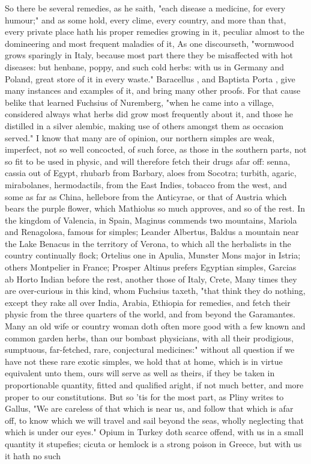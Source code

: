 {So there be several remedies, as he saith, "each disease a medicine, for every humour;" and as some hold, every clime, every country, and more than that, every private place hath his proper remedies growing in it, peculiar almost to the domineering and most frequent maladies of it, As one discourseth, "wormwood grows sparingly in Italy, because most part there they be misaffected with hot diseases: but henbane, poppy, and such cold herbs: with us in Germany and Poland, great store of it in every waste." Baracellus , and Baptista Porta , give many instances and examples of it, and bring many other proofs. For that cause belike that learned Fuchsius of Nuremberg, "when he came into a village, considered always what herbs did grow most frequently about it, and those he distilled in a silver alembic, making use of others amongst them as occasion served." I know that many are of opinion, our northern simples are weak, imperfect, not so well concocted, of such force, as those in the southern parts, not so fit to be used in physic, and will therefore fetch their drugs afar off: senna, cassia out of Egypt, rhubarb from Barbary, aloes from Socotra; turbith, agaric, mirabolanes, hermodactils, from the East Indies, tobacco from the west, and some as far as China, hellebore from the Anticyrae, or that of Austria which bears the purple flower, which Mathiolus so much approves, and so of the rest. In the kingdom of Valencia, in Spain, Maginus commends two mountains, Mariola and Renagolosa, famous for simples; Leander Albertus, Baldus a mountain near the Lake Benacus in the territory of Verona, to which all the herbalists in the country continually flock; Ortelius one in Apulia, Munster Mons major in Istria; others Montpelier in France; Prosper Altinus prefers Egyptian simples, Garcias ab Horto Indian before the rest, another those of Italy, Crete, \etc{} Many times they are over-curious in this kind, whom Fuchsius taxeth,  "that think they do nothing, except they rake all over India, Arabia, Ethiopia for remedies, and fetch their physic from the three quarters of the world, and from beyond the Garamantes. Many an old wife or country woman doth often more good with a few known and common garden herbs, than our bombast physicians, with all their prodigious, sumptuous, far-fetched, rare, conjectural medicines:" without all question if we have not these rare exotic simples, we hold that at home, which is in virtue equivalent unto them, ours will serve as well as theirs, if they be taken in proportionable quantity, fitted and qualified aright, if not much better, and more proper to our constitutions. But so 'tis for the most part, as Pliny writes to Gallus, "We are careless of that which is near us, and follow that which is afar off, to know which we will travel and sail beyond the seas, wholly neglecting that which is under our eyes." Opium in Turkey doth scarce offend, with us in a small quantity it stupefies; cicuta or hemlock is a strong poison in Greece, but with us it hath no such }
